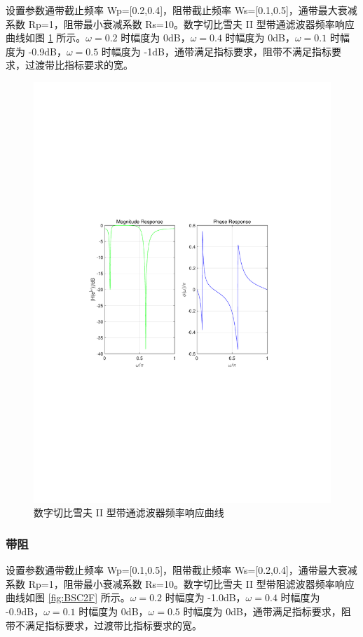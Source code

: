 \documentclass[12pt,AutoFakeBold]{article}
\begin{document}
设置参数通带截止频率 Wp=[0.2,0.4]，阻带截止频率 Ws=[0.1,0.5]，通带最大衰减系数 Rp=1，阻带最小衰减系数 Rs=10。数字切比雪夫 II 型带通滤波器频率响应曲线如图 \ref{fig:BPC2F} 所示。$\omega=0.2$ 时幅度为 0dB，$\omega=0.4$ 时幅度为 0dB，$\omega=0.1$ 时幅度为 -0.9dB，$\omega=0.5$ 时幅度为 -1dB，通带满足指标要求，阻带不满足指标要求，过渡带比指标要求的宽。

\begin{figure}[hbtp]
	\centering
	\includegraphics[width=14cm]{figure/BPC2F.pdf}
	\caption{数字切比雪夫 II 型带通滤波器频率响应曲线} \label{fig:BPC2F}
\end{figure}

\subsubsection{带阻}

设置参数通带截止频率 Wp=[0.1,0.5]，阻带截止频率 Ws=[0.2,0.4]，通带最大衰减系数 Rp=1，阻带最小衰减系数 Rs=10。数字切比雪夫 II 型带阻滤波器频率响应曲线如图 \ref{fig:BSC2F} 所示。$\omega=0.2$ 时幅度为 -1.0dB，$\omega=0.4$ 时幅度为 -0.9dB，$\omega=0.1$ 时幅度为 0dB，$\omega=0.5$ 时幅度为 0dB，通带满足指标要求，阻带不满足指标要求，过渡带比指标要求的宽。
\end{document}
